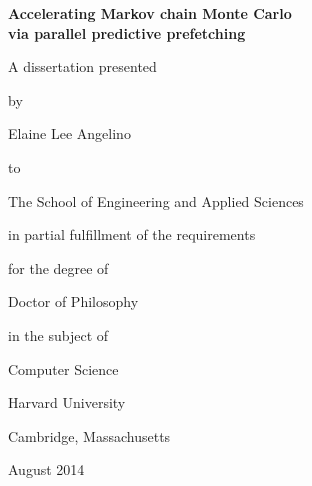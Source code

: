 \newpage
\setcounter{page}{1}
\begin{spacing}{2}

\begin{center}
\end{center}

\begin{center}
\end{center}


\begin{center}
\textbf{\textsf{\LARGE Accelerating Markov chain Monte Carlo \\
via parallel predictive prefetching}} \\
\end{center}

\begin{center}
\end{center}

\begin{center}
A dissertation presented

by

Elaine Lee Angelino

to

The School of Engineering and Applied Sciences \\
\end{center}


\begin{center}
in partial fulfillment of the requirements

for the degree of

Doctor of Philosophy

in the subject of

Computer Science \\
\end{center}


\begin{center}
Harvard University

Cambridge, Massachusetts \\
\end{center}


\begin{center}
August 2014
\end{center}

\end{spacing}

\thispagestyle{empty}
\pagestyle{empty}


\newpage

\null
\vfill

